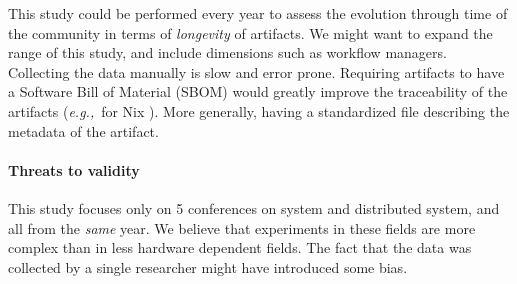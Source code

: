 \documentclass[sigconf,natbib=false]{acmart}
\newcommand{\eg}{\emph{e.g.,}}
\newcommand{\aeval}{Artifact Evaluation}
\newcommand{\todo}[1]{{\color{red}{TODO: #1}}}
\begin{document}
This study could be performed every year to assess the evolution through time of the community in terms of \emph{longevity} of artifacts.
We might want to expand the range of this study, and include dimensions such as workflow managers.
Collecting the data manually is slow and error prone.
Requiring artifacts to have a Software Bill of Material (SBOM) \cite{sbom, xia2023empirical} would greatly improve the traceability of the artifacts (\eg\ for Nix \cite{genealogos}).
More generally, having a standardized file describing the metadata of the artifact. \todo{}

\paragraph{Threats to validity}

This study focuses only on 5 conferences on system and distributed system, and all from the \emph{same} year.
We believe that experiments in these fields are more complex than in less hardware dependent fields.
The fact that the data was collected by a single researcher might have introduced some bias.


% 
% 
% 
% 
\end{document}
